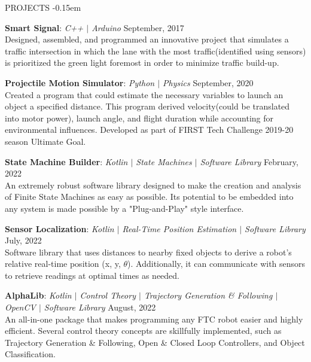 \documentclass{resume} %
\begin{document}
    \vspace{-0.8em}
    \begin{rSection}{PROJECTS}
        \vspace{-1.0em}
        \itemsep -0.15em {} 
        \item \textbf{Smart Signal}: \textit{C++ $\vert$ Arduino} \hfill {September, 2017}\vspace{0.25em} \\
        {Designed, assembled, and programmed an innovative project that simulates a traffic intersection in which the lane with the most traffic(identified using sensors) is prioritized the green light foremost in order to minimize traffic build-up.}

        \item \textbf{Projectile Motion Simulator}: \textit{Python $\vert$ Physics} \hfill {September, 2020}\vspace{0.25em} \\
        {Created a program that could estimate the necessary variables to launch an object a specified distance. This program derived velocity(could be translated into motor power), launch angle, and flight duration while accounting for environmental influences. Developed as part of FIRST Tech Challenge 2019-20 season Ultimate Goal.}

        \item \textbf{State Machine Builder}: \textit{Kotlin $\vert$ State Machines $\vert$ Software Library} \hfill {February, 2022}\vspace{0.25em} \\
        {An extremely robust software library designed to make the creation and analysis of Finite State Machines as easy as possible. Its potential to be embedded into any system is made possible by a "Plug-and-Play" style interface.}

        \item \textbf{Sensor Localization}: \textit{Kotlin $\vert$ Real-Time Position Estimation $\vert$ Software Library} \hfill {July, 2022} \vspace{0.25em}\\
        {Software library that uses distances to nearby fixed objects to derive a robot's relative real-time position (x, y, $\theta$). Additionally, it can communicate with sensors to retrieve readings at optimal times as needed.}

        \item \textbf{AlphaLib}: \textit{Kotlin $\vert$ Control Theory $\vert$ Trajectory Generation \& Following $\vert$ OpenCV $\vert$ Software Library} \hfill {August, 2022} \vspace{0.25em}\\
        {An all-in-one package that makes programming any FTC robot easier and highly efficient. Several control theory concepts are skillfully implemented, such as Trajectory Generation \& Following, Open \& Closed Loop Controllers, and Object Classification.}
    \end{rSection} 
\end{document}
